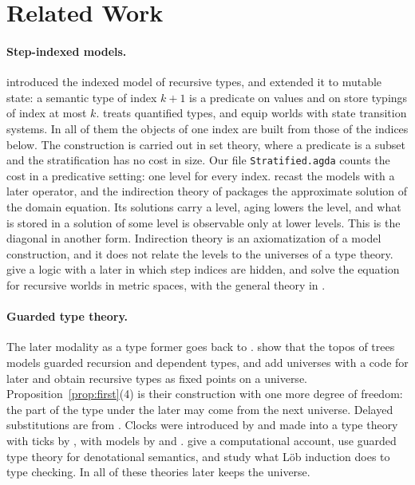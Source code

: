 \documentclass[acmsmall,nonacm,screen]{acmart}
\newcommand{\agda}[1]{\texttt{#1}}
\begin{document}
\section{Related Work}\label{sec:related}

\paragraph{Step-indexed models.}
\citet{AppelMcAllester2001} introduced the indexed model of recursive types, and
\citet{Ahmed2004} extended it to mutable state: a semantic type of index $k+1$ is a predicate
on values and on store typings of index at most $k$. \citet{Ahmed2006} treats quantified
types, and \citet{ADR2009} equip worlds with state transition systems. In all of them the
objects of one index are built from those of the indices below. The construction is carried
out in set theory, where a predicate is a subset and the stratification has no cost in
size. Our file \agda{Stratified.agda} counts the cost in a predicative setting: one level
for every index. \citet{AMRV2007} recast the models with a later operator, and the
indirection theory of \citet{HDA2010} packages the approximate solution of the domain
equation. Its solutions carry a level, aging lowers the level, and what is stored in a
solution of some level is observable only at lower levels. This is the diagonal in another
form. Indirection theory is an axiomatization of a model construction, and it does not
relate the levels to the universes of a type theory. \citet{DAB2011} give a logic with a
later in which step indices are hidden, and \citet{BRSSTY2011} solve the equation for
recursive worlds in metric spaces, with the general theory in
\citet{BST2010metric,BST2010real}.

\paragraph{Guarded type theory.}
The later modality as a type former goes back to \citet{Nakano2000}. \citet{BMSS2012} show
that the topos of trees models guarded recursion and dependent types, and
\citet{BM2013} add universes with a code for later and obtain recursive types as fixed
points on a universe. Proposition~\ref{prop:first}(4) is their construction with one more
degree of freedom: the part of the type under the later may come from the next universe.
Delayed substitutions are from \citet{gDTT2016}. Clocks were introduced by
\citet{AtkeyMcBride2013} and made into a type theory with ticks by \citet{CloTT2017}, with
models by \citet{BizjakMogelberg2020} and \citet{MMV2020}. \citet{SterlingHarper2018} give a
computational account, \citet{PMB2015} use guarded type theory for denotational semantics,
and \citet{GratzerBirkedal2022} study what L\"ob induction does to type checking. In all of
these theories later keeps the universe.
\end{document}
